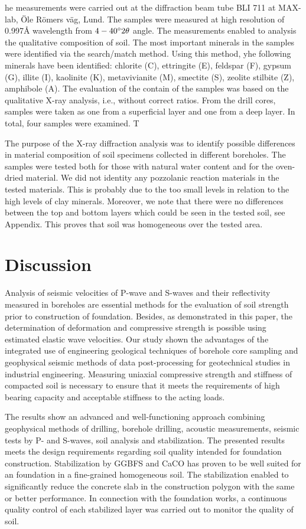 \documentclass[USenglish,twocolumn]{article}
\begin{document}
he measurements were carried out at the diffraction beam tube BLI 711 at MAX-lab, Öle Römers väg, Lund. The samples were measured at high resolution of 0.997Å wavelength from $4-40\degree 2 \theta$ angle. The measurements enabled to analysis the qualitative composition of soil. The most important minerals in the samples were identified via the search/match method. Using this method, yhe following minerals have been identified: chlorite (C), ettringite (E), feldspar (F), gypsum (G), illite (I), kaolinite (K), metavivianite (M), smectite (S), zeolite stilbite (Z), amphibole (A). The evaluation of the contain of the samples was based on the qualitative X-ray analysis, i.e., without correct ratios. From the drill cores, samples were taken as one from a superficial layer and one from a deep layer. In total, four samples were examined. T

The purpose of the X-ray diffraction analysis was to identify possible differences in material composition of soil specimens collected in different boreholes. The samples were tested both for those with natural water content and for the oven-dried material. We did not identity any pozzolanic reaction materials in the tested materials. This is probably due to the too small levels in relation to the high levels of clay minerals. Moreover, we note that there were no differences between the top and bottom layers which could be seen in the tested soil, see Appendix. This proves that soil was homogeneous over the tested area.

\section{Discussion}\label{sec:6}

Analysis of seismic velocities of P-wave and S-waves and their reflectivity measured in boreholes are essential methods for the evaluation of soil strength prior to construction of foundation. Besides, as demonstrated in this paper, the determination of deformation and compressive strength is possible using estimated elastic wave velocities. Our study shown the advantages of the integrated use of engineering geological techniques of borehole core sampling and geophysical seismic methods of data post-processing for geotechnical studies in industrial engineering. Measuring uniaxial compressive strength and stiffness of compacted soil is necessary to ensure that it meets the requirements of high bearing capacity and acceptable stiffness to the acting loads.

The results show an advanced and well-functioning approach combining geophysical methods of drilling, borehole drilling, acoustic measurements, seismic tests by P- and S-waves, soil analysis and stabilization. The presented results meets the design requirements regarding soil quality intended for foundation construction. Stabilization by GGBFS and CaCO has proven to be well suited for an  foundation in a fine-grained homogeneous soil. The stabilization enabled to significantly reduce the concrete slab in the construction polygon with the same or better performance. In connection with the foundation works, a continuous quality control of each stabilized layer was carried out to monitor the quality of soil. 
\end{document}

